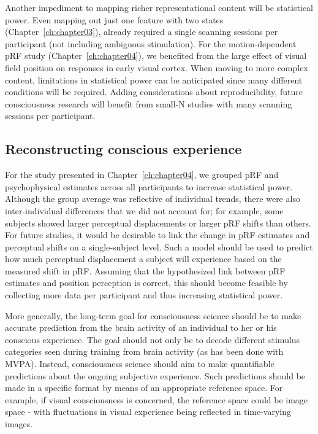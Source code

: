 Another impediment to mapping richer representational content will be statistical power. Even mapping out just one feature with two states (Chapter~\ref{ch:chapter03}), already required a single scanning sessions per participant (not including ambiguous stimulation). For the motion-dependent pRF study (Chapter~\ref{ch:chapter04}), we benefited from the large effect of visual field position on responses in early visual cortex. When moving to more complex content, limitations in statistical power can be anticipated since many different conditions will be required. Adding considerations about reproducibility, future consciousness research will benefit from small-N studies with many scanning sessions per participant.

\subsection{Reconstructing conscious experience}
For the study presented in Chapter~\ref{ch:chapter04}, we grouped pRF and psychophysical estimates across all participants to increase statistical power. Although the group average was reflective of individual trends, there were also inter-individual differences that we did not account for; for example, some subjects showed larger perceptual displacements or larger pRF shifts than others. For future studies, it would be desirable to link the change in pRF estimates and perceptual shifts on a single-subject level. Such a model should be used to predict how much perceptual displacement a subject will experience based on the measured shift in pRF. Assuming that the hypothesized link between pRF estimates and position perception is correct, this should become feasible by collecting more data per participant and thus increasing statistical power.

More generally, the long-term goal for consciousness science should be to make accurate prediction from the brain activity of an individual to her or his conscious experience. The goal should not only be to decode different stimulus categories seen during training from brain activity (as has been done with MVPA). Instead, consciousness science should aim to make quantifiable predictions about the ongoing subjective experience. Such predictions should be made in a specific format by means of an appropriate reference space. For example, if visual consciousness is concerned, the reference space could be image space - with fluctuations in visual experience being reflected in time-varying images.

